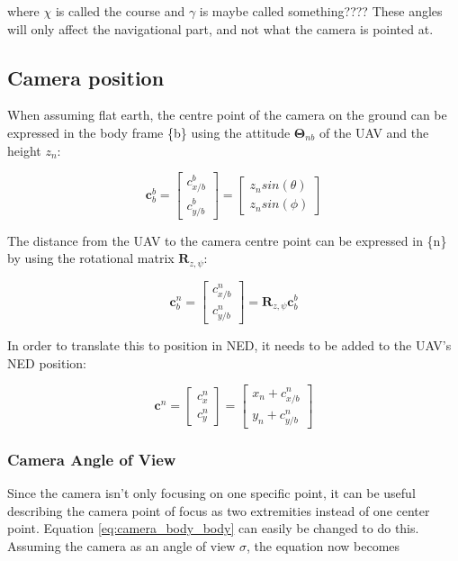 \documentclass{article}
\begin{document}
where $\chi$ is called the course and $\gamma$ is maybe called something???? These angles will only affect the navigational part, and not what the camera is pointed at.

\subsection*{Camera position}
When assuming flat earth, the centre point of the camera on the ground can be expressed in the body frame \{b\} using the attitude $\bm{\Theta}_{nb}$ of the UAV and the height $z_n$:

\begin{equation}
	\bm{c}_b^b = 
	\begin{bmatrix}
		c_{x/b}^b \\ c_{y/b}^b
	\end{bmatrix}
	=
	\begin{bmatrix}
		z_n sin(\theta) \\ z_n sin(\phi)
	\end{bmatrix}
	\label{eq:camera_body_body}
\end{equation}

The distance from the UAV to the camera centre point can be expressed in \{n\} by using the rotational matrix $\bm{R}_{z,\psi}$:

\begin{equation} \label{eq:body_ned_rotate}
	\bm{c}^n_b = 
	\begin{bmatrix}
		c^n_{x/b} \\ c^n_{y/b}
	\end{bmatrix}
	= \bm{R}_{z, \psi}\bm{c}^b_b
\end{equation}

In order to translate this to position in NED, it needs to be added to the UAV's NED position:

\begin{equation}
	\bm{c}^n =
	\begin{bmatrix}
		c_x^n \\ c_y^n
	\end{bmatrix}
	=
	\begin{bmatrix}
		x_n + c^n_{x/b} \\
		y_n + c^n_{y/b}
	\end{bmatrix}
	\label{eq:body_ned_trans}
\end{equation}

\subsubsection*{Camera Angle of View}
Since the camera isn't only focusing on one specific point, it can be useful describing the camera point of focus as two extremities instead of one center point. Equation \eqref{eq:camera_body_body} can easily be changed to do this. Assuming the camera as an angle of view $\sigma$, the equation now becomes
\end{document}
